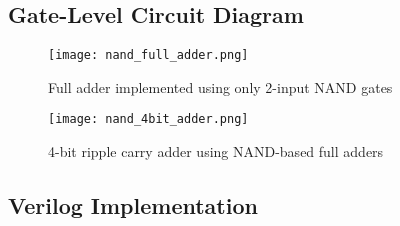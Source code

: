 \documentclass{article}
\begin{document}
\subsection{Gate-Level Circuit Diagram}

\begin{figure}[H]
	\centering
	\texttt{[image: nand\_full\_adder.png]}
	\caption{Full adder implemented using only 2-input NAND gates}
	\label{fig:nand_full_adder}
\end{figure}

\begin{figure}[H]
	\centering
	\texttt{[image: nand\_4bit\_adder.png]}
	\caption{4-bit ripple carry adder using NAND-based full adders}
	\label{fig:nand_4bit_adder}
\end{figure}

\subsection{Verilog Implementation}
\end{document}
